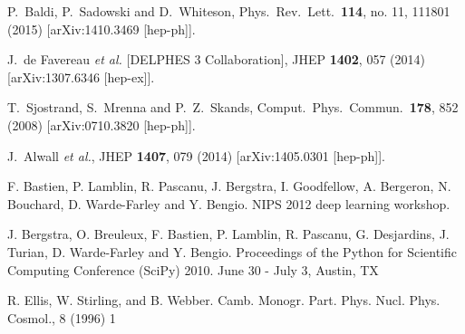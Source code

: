   P.~Baldi, P.~Sadowski and D.~Whiteson,
  Phys.\ Rev.\ Lett.\  {\bf 114}, no. 11, 111801 (2015)
  [arXiv:1410.3469 [hep-ph]].

  J.~de Favereau {\it et al.} [DELPHES 3 Collaboration],
  JHEP {\bf 1402}, 057 (2014)
  [arXiv:1307.6346 [hep-ex]].

  T.~Sjostrand, S.~Mrenna and P.~Z.~Skands,
  Comput.\ Phys.\ Commun.\  {\bf 178}, 852 (2008)
  [arXiv:0710.3820 [hep-ph]].

  J.~Alwall {\it et al.},
  JHEP {\bf 1407}, 079 (2014)
  [arXiv:1405.0301 [hep-ph]].

F. Bastien, P. Lamblin, R. Pascanu, J. Bergstra, I. Goodfellow, A. Bergeron, N. Bouchard, D. Warde-Farley and Y. Bengio. NIPS 2012 deep learning workshop.

J. Bergstra, O. Breuleux, F. Bastien, P. Lamblin, R. Pascanu, G. Desjardins, J. Turian, D. Warde-Farley and Y. Bengio.  Proceedings of the Python for Scientific Computing Conference (SciPy) 2010. June 30 - July 3, Austin, TX


  R. Ellis, W. Stirling, and B. Webber.%
   Camb. Monogr. Part. Phys. Nucl. Phys. Cosmol., 8 (1996) 1
